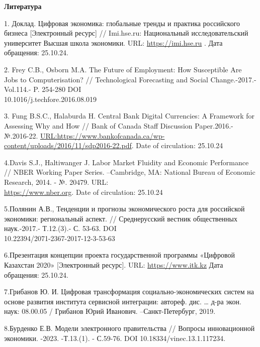 \begin{center}
{\bfseries Литература}
\end{center}

\begin{references}
1. Доклад. Цифровая экономика: глобальные тренды и практика российского
бизнеса {[}Электронный ресурс{]} // Imi.hse.ru: Национальный
исследовательский университет Высшая школа экономики. URL:
\href{https://imi.hse.ru/pr2017_1}{https://imi.hse.ru} . Дата обращения: 25.10.24.

2. Frey C.B., Osborn M.A. The Future of Employment: How Susceptible Are
Jobs to Computerisation? // Technological Forecasting and Social
Change.-2017.-Vol.114.- P. 254-280
DOI \\10.1016/j.techfore.2016.08.019

3. Fung B.S.C., Halaburda H. Central Bank Digital Currencies: A Framework
for Assessing Why and How // Bank of Canada Staff Discussion
Paper.2016.-№.2016-22.
\href{url:https://www.bankofcanada.ca/wp-content/uploads/2016/11/sdp2016-22.pdf}{URL:https://www.bankofcanada.ca/wp-content/uploads/2016/11/sdp2016-22.pdf}. Date of circulation: 25.10.24

4.Davis S.J., Haltiwanger J. Labor Market Fluidity and Economic
Performance // NBER Working Paper Series. --Cambridge, MA: National
Bureau of Economic Research, 2014. - №. 20479. URL:\\
\href{https://www.nber.org/system/files/working_papers/w20479/w20479.pdf}{https://www.nber.org}.
Date of circulation: 25.10.24

5.Полянин А.В., Тенденции и прогнозы экономического роста для российской
экономики: региональный аспект. // Среднерусский вестник общественных
наук.-2017.- Т.12.(3).- С. 53-63. DOI \\10.22394/2071-2367-2017-12-3-53-63

6.Презентация концепции проекта государственной программы «Цифровой
Казахстан 2020» {[}Электронный ресурс{]}. URL:
\href{https://www.itk.kz/doc/images/Digital\_Kazakhstan.pdf}{https://www.itk.kz} Дата обращения:
25.10.24.

7.Грибанов Ю. И. Цифровая трансформация социально-экономических систем
на основе развития института сервисной интеграции: автореф. дис.
\ldots{} д-ра экон. наук: 08.00.05 / Грибанов Юрий Иванович.
--Санкт-Петербург, 2019.

8.Бурденко Е.В. Модели электронного правительства // Вопросы
инновационной экономики. -2023. -Т.13.(1). - С.59-76. DOI
10.18334/vinec.13.1.117234.


\end{references}
